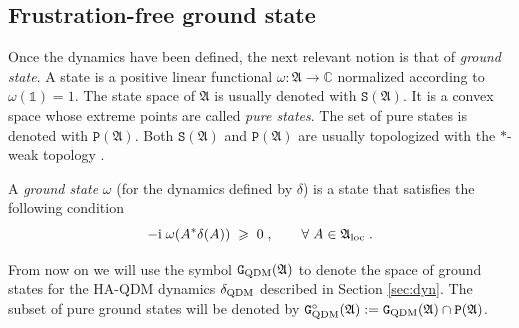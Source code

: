 \documentclass[a4paper,12pt,twoside,reqno]{amsart}
\theoremstyle{plain}
\theoremstyle{definition}
\theoremstyle{remark}
\numberwithin{equation}{section}
\numberwithin{figure}{section}
\numberwithin{table}{section}
\newcommand{\n}[1]{\mathbb{#1}}
\begin{document}
	
	
	
	
	
	
	
	
	
	
	
	\subsection{Frustration-free ground state}\label{sec:frustration-free ground state}
	
	
	
	
	
	
	
	Once the dynamics have been defined, the next relevant notion is that of \emph{ground state}. A state is a positive linear functional $\omega:\mathfrak{A} \to \mathbb{C}$ normalized according to  $\omega(\n{1}) = 1$. The state space of $\mathfrak{A}$ is usually denoted with ${\mathtt{S}}(\mathfrak{A})$. It is a convex space
	whose extreme points are called \emph{pure states}. The set of pure states is denoted with $\mathtt{P}(\mathfrak{A})$. Both $\mathtt{S}(\mathfrak{A})$ and $\mathtt{P}(\mathfrak{A})$ are usually  topologized with the $\ast$-weak topology \cite[Section 2.3.2]{Bratelli}.
	
	
	
	
	
	
	
	\medskip
	
	
	
	
	
	
	
	
	A \emph{ground state} $\omega$ (for the dynamics defined by $\delta$) is a state that satisfies the following condition 
	\begin{equation*}
		-{\rm i}\;\omega(A^*\delta(A))\; \geqslant \;0\;,\qquad \forall \; A\in\mathfrak{A}_{\rm loc}\;.
	\end{equation*}
	
	
	
	
	
	
	\medskip
	
	
	
	
	
	From now on we will use the symbol
	$\mathtt{G}_{\rm QDM}(\mathfrak{A})$ to denote the space of ground states for  
	the {HA-QDM dynamics} $\delta_{\rm QDM}$ described in Section \ref{sec:dyn}. The subset of pure ground states will be denoted by $\mathtt{G}_{\rm QDM}^{\circ}(\mathfrak{A}):=\mathtt{G}_{\rm QDM}(\mathfrak{A})\cap\mathtt{P}(\mathfrak{A})$.
	
\end{document}
